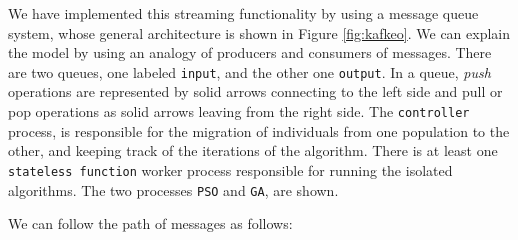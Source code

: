 We have implemented this streaming functionality by using a message queue
system, whose general architecture is shown in Figure \ref{fig:kafkeo}. We can explain
the model by using an analogy of producers and consumers of messages. There are
two queues, one labeled \texttt{input}, and the other one \texttt{output}. In a
queue, {\em push} operations are represented by solid arrows connecting to the
left side and pull or pop operations as solid arrows leaving from the right
side. The \texttt{controller} process, is responsible for the migration of
individuals from one population to the other, and keeping track of the
iterations of the algorithm. There is at least one \texttt{stateless function}
worker process responsible for running the isolated algorithms. The two
processes \texttt{PSO} and \texttt{GA}, are shown.

We can follow the path of messages as follows:

